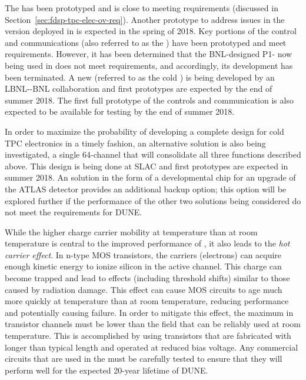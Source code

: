 The   has been prototyped and is close to meeting requirements (discussed in Section~\ref{sec:fdsp-tpc-elec-ov-req}). Another prototype to address issues in the version deployed in  is expected in the spring of 2018. Key portions of the control and communications  (also referred to as the  ) have been prototyped and meet requirements.  However, it has been determined that the BNL-designed P1-  now being used in  does not meet requirements, and accordingly, its development has been terminated.  A new   (referred to as the cold  ) is being developed by an LBNL-\fnal-BNL collaboration and first prototypes are expected by the end of summer 2018.  The first full prototype of the controls and communication  is also expected to be available for testing by the end of summer 2018. 

In order to maximize the probability of developing a complete design for cold TPC  electronics in a timely fashion, an alternative solution is also being investigated, a single \num{64}-channel  that will consolidate all three functions described above.  This design is being done at SLAC and first prototypes are expected in summer 2018.  An  solution in the form of a developmental  chip for an upgrade of the ATLAS detector provides an additional backup option; this option will be explored further if the performance of the other two  solutions being considered do not meet the requirements for DUNE.

While the higher charge carrier mobility at \lar temperature than at room temperature is central to the improved performance of , it also leads to the \textit{hot carrier effect}.  In n-type MOS transistors, the carriers (electrons) can acquire enough kinetic energy to ionize silicon in the active channel.  This charge can become trapped and lead to effects (including threshold shifts) similar to those caused by radiation damage.  This effect can cause MOS circuits to age much more quickly at \lar temperature than at room temperature, reducing performance and potentially causing failure.  In order to mitigate this effect, the maximum \efield in transistor channels must be lower than the field that can be reliably used at room temperature.  
This is accomplished by using transistors that are fabricated with longer than typical length and operated at reduced bias voltage.  Any commercial circuits that are used in the \lar must be carefully tested to ensure that they will perform well for the expected \num{20}-year lifetime of DUNE.

